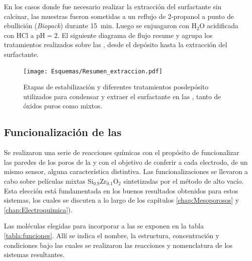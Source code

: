		En los casos donde fue necesario realizar la extracción del surfactante sin calcinar, las muestras fueron sometidas a un reflujo de 2-propanol a punto de ebullición (\textit{Biopack}) durante \SI{15}{\minute}. Luego se enjuagaron con H$_2$O acidificada con HCl a $\text{pH}=2$. El siguiente diagrama de flujo resume y agrupa los tratamientos realizados sobre las \pdm, desde el depósito hasta la extracción del surfactante.
		
				\begin{figure}[ht!]
						  \begin{center}
						  \texttt{[image: Esquemas/Resumen\_extraccion.pdf]}
						  \caption[Tratamientos pos-depósito de \pdm]{Etapas de estabilización y diferentes tratamientos posdepósito utilizados para condensar y extraer el surfactante en las \pdm, tanto de óxidos puros como mixtos.}
						  \label{esq:peliculas_meso_tratamientos}
						  \end{center}
						  \end{figure}
    \vspace*{-0.3cm}
	\subsection{Funcionalización de las \pdm}\label{sub:funcionalizaci_n_de_las_pdm}
	
		Se realizaron una serie de reacciones químicas con el propósito de funcionalizar las paredes de los poros de la \pdm\space y con el objetivo de conferir a cada electrodo, de un mismo sensor, alguna característica distintiva. Las funcionalizaciones se llevaron a cabo sobre películas mixtas Si$_{0.9}$Zr$_{0.1}$O$_2$ sintetizadas por el método de alto vacío. Esta elección está fundamentada en los buenos resultados obtenidos para estos sistemas, los cuales se discuten a lo largo de los capítulos \ref{chap:Mesoporosos} y \ref{chap:Electroquimica}).

		Las moléculas elegidas para incorporar a las \pdmZ\space se exponen en la tabla \ref{tabla:funciones}. Allí se indica el nombre, la estructura, concentración y condiciones bajo las cuales se realizaron las reacciones y nomenclatura de los sistemas resultantes.

